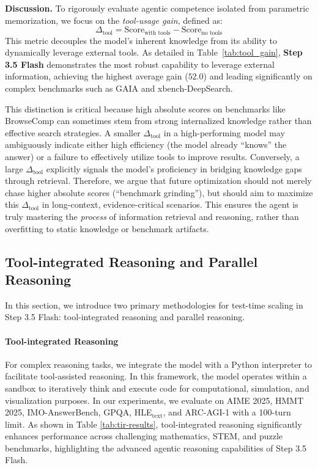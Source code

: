 \vspace{+1cm}
\noindent\textbf{Discussion.}
To rigorously evaluate agentic competence isolated from parametric memorization, we focus on the \emph{tool-usage gain}, defined as:
\[
\Delta_{\text{tool}} = \text{Score}_{\text{with tools}} - \text{Score}_{\text{no tools}}
\]
This metric decouples the model's inherent knowledge from its ability to dynamically leverage external tools. As detailed in Table~\ref{tab:tool_gain}, \textbf{Step 3.5 Flash} demonstrates the most robust capability to leverage external information, achieving the highest average gain ($52.0$) and leading significantly on complex benchmarks such as GAIA and xbench-DeepSearch.

This distinction is critical because high absolute scores on benchmarks like BrowseComp can sometimes stem from strong internalized knowledge rather than effective search strategies. A smaller $\Delta_{\text{tool}}$ in a high-performing model may ambiguously indicate either high efficiency (the model already ``knows'' the answer) or a failure to effectively utilize tools to improve results. Conversely, a large $\Delta_{\text{tool}}$ explicitly signals the model's proficiency in bridging knowledge gaps through retrieval.
Therefore, we argue that future optimization should not merely chase higher absolute scores (``benchmark grinding''), but should aim to maximize this $\Delta_{\text{tool}}$ in long-context, evidence-critical scenarios. This ensures the agent is truly mastering the \emph{process} of information retrieval and reasoning, rather than overfitting to static knowledge or benchmark artifacts.


\subsection{Tool-integrated Reasoning and Parallel Reasoning}

In this section, we introduce two primary methodologies for test-time scaling in Step 3.5 Flash: tool-integrated reasoning and parallel reasoning.
\paragraph{Tool-integrated Reasoning}
For complex reasoning tasks, we integrate the model with a Python interpreter to facilitate tool-assisted reasoning. In this framework, the model operates within a sandbox to iteratively think and execute code for computational, simulation, and visualization purposes. In our experiments, we evaluate on AIME 2025, HMMT 2025, IMO-AnswerBench, GPQA, HLE$_{\text{text}}$, and ARC-AGI-1 with a 100-turn limit.
As shown in Table \ref{tab:tir-results}, tool-integrated reasoning significantly enhances performance across challenging mathematics, STEM, and puzzle benchmarks, highlighting the advanced agentic reasoning capabilities of Step 3.5 Flash.

